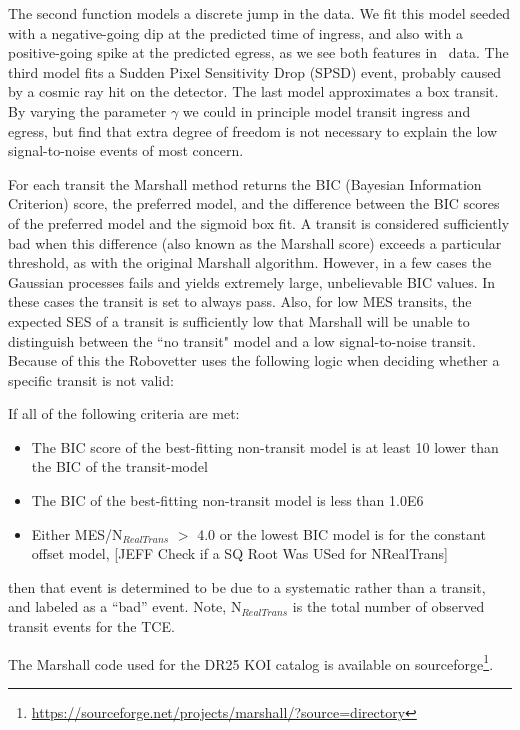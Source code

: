 The second function models a discrete jump in the data. We fit this model seeded with a negative-going dip at the predicted time of ingress, and also with a positive-going spike at the predicted egress, as we see both features in \Kepler\ data. The third model fits a Sudden Pixel Sensitivity Drop (SPSD) event, probably caused by a cosmic ray hit on the detector. The last model approximates a box transit. By varying the parameter $\gamma$ we could in principle model transit ingress and egress, but find that extra degree of freedom is not necessary to explain the low signal-to-noise events of most concern.

For each transit the Marshall method returns the BIC (Bayesian Information Criterion) score, the preferred model, and the difference between the BIC scores of the preferred model and the sigmoid box fit.  A transit is considered sufficiently bad when this difference (also known as the Marshall score) exceeds a particular threshold, as with the original Marshall algorithm.  However, in a few cases the Gaussian processes fails and yields extremely large, unbelievable BIC values. In these cases the transit is set to always pass.  Also, for low MES transits, the expected SES of a transit is sufficiently low that Marshall will be unable to distinguish between the ``no transit" model and a low signal-to-noise transit.  Because of this the Robovetter uses the following logic when deciding whether a specific transit is not valid:


If all of the following criteria are met:

\begin{itemize}
\item The BIC score of the best-fitting non-transit model is at least 10 lower than the BIC of the transit-model
\item The BIC of the best-fitting non-transit model is less than 1.0E6
\item Either MES/N$_{RealTrans}$ $>$ 4.0 or the lowest BIC model is for the constant offset model, [JEFF Check if a SQ Root Was USed for NRealTrans]
\end{itemize}

\noindent then that event is determined to be due to a systematic rather than a transit, and labeled as a ``bad'' event. Note, N$_{RealTrans}$ is the total number of observed transit events for the TCE.

The Marshall code used for the DR25 KOI catalog is available on sourceforge\footnote{ \url{https://sourceforge.net/projects/marshall/?source=directory}}.


